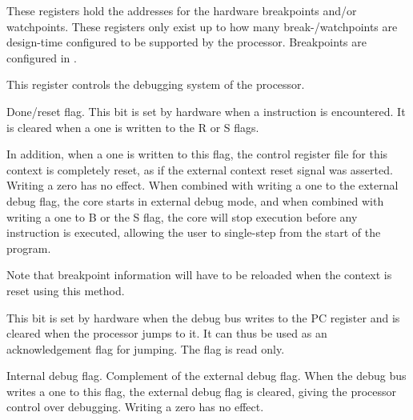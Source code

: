 
These registers hold the addresses for the hardware breakpoints and/or
watchpoints. These registers only exist up to how many break-/watchpoints are
design-time configured to be supported by the processor. Breakpoints are
configured in .

\debugCanWrite{}
\coreCanWrite{}


This register controls the debugging system of the \rvex{} processor.

\debugCanWrite{}

Done/reset flag. This bit is set by hardware when a  instruction is 
encountered. It is cleared when a one is written to the R or S flags.

In addition, when a one is written to this flag, the control register file for 
this context is completely reset, as if the external context reset signal was 
asserted. Writing a zero has no effect. When combined with writing a one to the 
external debug flag, the core starts in external debug mode, and when combined 
with writing a one to B or the S flag, the core will stop execution before any 
instruction is executed, allowing the user to single-step from the start of the 
program.

Note that breakpoint information will have to be reloaded when the context is 
reset using this method.


This bit is set by hardware when the debug bus writes to the PC register and is 
cleared when the processor jumps to it. It can thus be used as an acknowledgement
flag for jumping. The flag is read only.

\debugCanWrite{}

Internal debug flag. Complement of the external debug flag. When the debug bus 
writes a one to this flag, the external debug flag is cleared, giving the
processor control over debugging. Writing a zero has no effect.

\debugCanWrite{}

